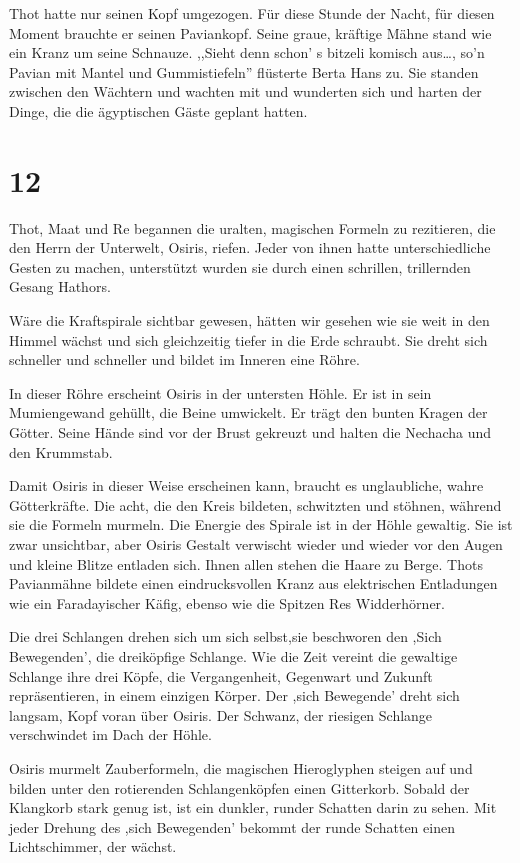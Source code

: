 \documentclass[11pt,titlepage,a5paper]{book}
\begin{document}
Thot hatte nur seinen Kopf umgezogen. Für diese Stunde der Nacht, für diesen Moment brauchte er seinen Paviankopf. Seine graue, kräftige Mähne stand wie ein Kranz um seine Schnauze. ,,Sieht denn schon' s bitzeli komisch aus\dots, so'n Pavian mit Mantel und Gummistiefeln'' flüsterte Berta Hans zu. Sie standen zwischen den Wächtern und wachten mit und wunderten sich und harten der Dinge, die die ägyptischen Gäste geplant hatten.


\section*{12}

Thot, Maat und Re begannen die uralten, magischen Formeln zu rezitieren, die den Herrn der Unterwelt, Osiris, riefen. Jeder von ihnen hatte unterschiedliche Gesten zu machen, unterstützt wurden sie durch einen schrillen, trillernden Gesang Hathors.

Wäre die Kraftspirale sichtbar gewesen, hätten wir gesehen wie sie weit in den Himmel wächst und sich gleichzeitig tiefer in die Erde schraubt. Sie dreht sich schneller und schneller und bildet im Inneren eine Röhre. 

In dieser Röhre erscheint Osiris in der untersten Höhle. Er ist in sein Mumiengewand gehüllt, die Beine umwickelt. Er trägt den bunten Kragen der Götter. Seine Hände sind vor der Brust gekreuzt und halten die Nechacha und den Krummstab.

Damit Osiris in dieser Weise erscheinen kann, braucht es unglaubliche, wahre Götterkräfte. Die acht, die den Kreis bildeten, schwitzten und stöhnen, während sie die Formeln murmeln. Die Energie des Spirale ist in der Höhle gewaltig. Sie ist zwar unsichtbar, aber Osiris Gestalt verwischt wieder und wieder vor den Augen und kleine Blitze entladen sich. Ihnen allen stehen die Haare zu Berge. Thots Pavianmähne bildete einen eindrucksvollen Kranz aus elektrischen Entladungen wie ein Faradayischer Käfig, ebenso wie die Spitzen Res Widderhörner. 

Die drei Schlangen drehen sich um sich selbst,sie beschworen den ,Sich Bewegenden', die dreiköpfige Schlange. Wie die Zeit vereint die gewaltige Schlange ihre drei Köpfe, die Vergangenheit, Gegenwart und Zukunft repräsentieren, in einem einzigen Körper. Der ,sich Bewegende' dreht sich langsam, Kopf voran über Osiris. Der Schwanz, der riesigen Schlange verschwindet im Dach der Höhle. 

Osiris murmelt Zauberformeln, die magischen Hieroglyphen steigen auf und bilden unter den rotierenden Schlangenköpfen einen Gitterkorb. Sobald der Klangkorb stark genug ist, ist ein dunkler, runder Schatten darin zu sehen. Mit jeder Drehung des ,sich Bewegenden' bekommt der runde Schatten einen Lichtschimmer, der wächst.
\end{document}
